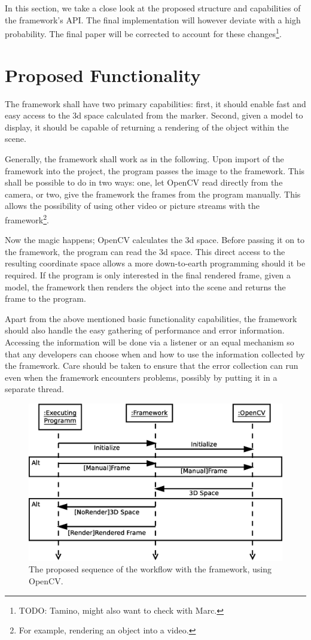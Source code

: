 In this section, we take a close look at the proposed structure and capabilities of the framework's API.
The final implementation will however deviate with a high probability.
The final paper will be corrected to account for these changes\footnote{TODO: Tamino, might also want to check with Marc.}.

\section{Proposed Functionality}

The framework shall have two primary capabilities: first, it should enable fast and easy access to the 3d space calculated from the marker.
Second, given a model to display, it should be capable of returning a rendering of the object within the scene.

Generally, the framework shall work as in the following.
Upon import of the framework into the project, the program passes the image to the framework.
This shall be possible to do in two ways: one, let OpenCV read directly from the camera, or two, give the framework the frames from the program manually.
This allows the possibility of using other video or picture streams with the framework\footnote{For example, rendering an object into a video.}.

Now the magic happens; OpenCV calculates the 3d space.
Before passing it on to the framework, the program can read the 3d space.
This direct access to the resulting coordinate space allows a more down-to-earth programming should it be required.
If the program is only interested in the final rendered frame, given a model, the framework then renders the object into the scene and returns the frame to the program.

Apart from the above mentioned basic functionality capabilities, the framework should also handle the easy gathering of performance and error information.
Accessing the information will be done via a listener or an equal mechanism so that any developers can choose when and how to use the information collected by the framework.
Care should be taken to ensure that the error collection can run even when the framework encounters problems, possibly by putting it in a separate thread.

\begin{figure}
	\centering
	\includegraphics[width=12cm]{img/sequence_access.eps}
	\caption[Access Sequence.]{The proposed sequence of the workflow with the framework, using OpenCV.}
	\label{fig:sequence_access}
\end{figure}

